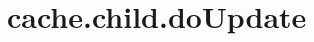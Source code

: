 \section{cache.child.doUpdate}
\label{configuration:CacheChildDoUpdate}
\AvailableInCsharpOnly{\TODO}